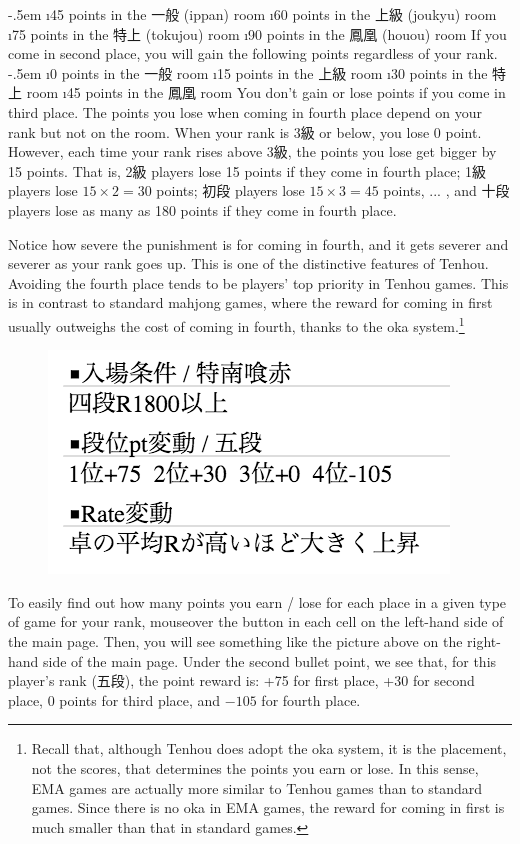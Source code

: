 \bi \itemsep-.5em
	\i 45 points in the 一般 ({\jap ippan}) room
	\i 60 points in the 上級 ({\jap joukyu}) room
	\i 75 points in the 特上 ({\jap tokujou}) room
	\i 90 points in the 鳳凰 ({\jap houou}) room
\ei
If you come in second place, you will gain the following points regardless of your rank.
	\bi \itemsep-.5em
	\i 0 points in the 一般 room
	\i 15 points in the 上級 room
	\i 30 points in the 特上 room
	\i 45 points in the 鳳凰 room
\ei
You don't gain or lose points if you come in third place. 
The points you lose when coming in fourth place depend on your rank but not on the room. When your rank is 3級 or below, you lose 0 point. However, each time your rank rises above 3級, the points you lose get bigger by 15 points. 
That is, 2級 players lose 15 points if they come in fourth place; 1級 players lose $15 \times 2 = 30$ points; 初段 players lose $15 \times 3 = 45$ points, ... , and 十段 players lose as many as 180 points if they come in fourth place.

\bigskip
Notice how severe the punishment is for coming in fourth, and it gets severer and severer as your rank goes up. This is one of the distinctive features of {\jap Tenhou}. 
Avoiding the fourth place tends to be players' top priority in {\jap Tenhou} games. This is in contrast to standard mahjong games, where the reward for coming in first usually outweighs the cost of coming in fourth, thanks to the {\jap oka} system.\footnote{Recall that, although {\jap Tenhou} does adopt the {\jap oka} system, it is the placement, not the scores, that determines the points you earn or lose. In this sense, EMA games are actually more similar to {\jap Tenhou} games than to standard games. Since there is no {\jap oka} in EMA games, the reward for coming in first is much smaller than that in standard games.} 

\bigskip

\begin{figure}
\vspace{-10pt}
\begin{center}
\includegraphics[width=.45\textwidth,clip]{figs/pt}
\end{center}
\vspace{-20pt}
\end{figure}
To easily find out how many points you earn / lose for each place in a given type of game for your rank, mouseover the  button in each cell on the left-hand side of the main page. Then, you will see something like the picture above on the right-hand side of the main page. Under the second bullet point, we see that, for this player's rank (五段), the point reward is: +75 for first place, +30 for second place, 0 points for third place, and $-105$ for fourth place. 

